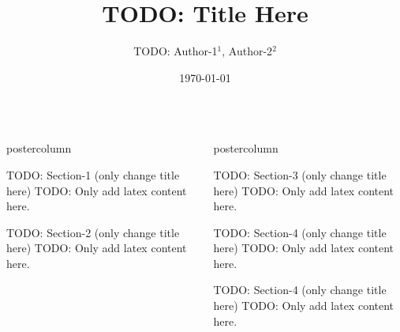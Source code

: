 \documentclass{beamer}
\title{\LARGE TODO: Title Here}
\author{TODO: Author-1$^{1}$, Author-2$^{2}$}
\institute[TUM]{
$^{1}$ TODO: affiliation-1 \\ 
$^{2}$ TODO: affiliation-2
}
\date{\today}
\newlength{\columnheight}
\begin{document}
\begin{frame}
\begin{columns}

\begin{column}{.43\textwidth}
\begin{beamercolorbox}[center]{postercolumn}
\begin{minipage}{.98\textwidth}
\parbox[t][\columnheight]{\textwidth}{

\begin{myblock}{TODO: Section-1 (only change title here)}
TODO: Only add latex content here.
\end{myblock}\vfill

\begin{myblock}{TODO: Section-2 (only change title here)}
TODO: Only add latex content here.
\end{myblock}\vfill

}\end{minipage}\end{beamercolorbox}
\end{column}

\begin{column}{.57\textwidth}
\begin{beamercolorbox}[center]{postercolumn}
\begin{minipage}{.98\textwidth}
\parbox[t][\columnheight]{\textwidth}{

\begin{myblock}{TODO: Section-3 (only change title here)}
TODO: Only add latex content here.
\end{myblock}\vfill

\begin{myblock}{TODO: Section-4 (only change title here)}
TODO: Only add latex content here.
\end{myblock}\vfill

\begin{myblock}{TODO: Section-4 (only change title here)}
TODO: Only add latex content here.
\end{myblock}\vfill

}
\end{minipage}
\end{beamercolorbox}
\end{column}
\end{columns}
\end{frame}
\end{document}
